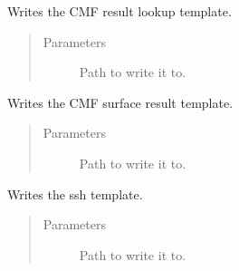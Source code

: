 \documentclass[letterpaper,10pt,english]{sphinxmanual}
\begin{document}
\begin{fulllineitems}
\label{\detokenize{lib:livestock.lib.templates.process_cmf_results}}
Writes the CMF result lookup template.
\begin{quote}\begin{description}
\item[{Parameters}] \leavevmode
{} \textendash{} Path to write it to.

\end{description}\end{quote}

\end{fulllineitems}


\begin{fulllineitems}
\label{\detokenize{lib:livestock.lib.templates.process_cmf_surface_results}}
Writes the CMF surface result template.
\begin{quote}\begin{description}
\item[{Parameters}] \leavevmode
{} \textendash{} Path to write it to.

\end{description}\end{quote}

\end{fulllineitems}


\begin{fulllineitems}
\label{\detokenize{lib:livestock.lib.templates.ssh_template}}
Writes the ssh template.
\begin{quote}\begin{description}
\item[{Parameters}] \leavevmode
{} \textendash{} Path to write it to.

\end{description}\end{quote}

\end{fulllineitems}
\end{document}
